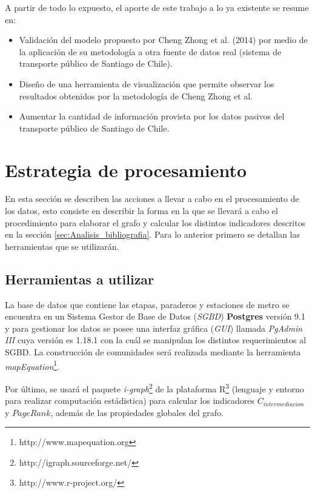 \documentclass[12pt]{article}
\begin{document}
	A partir de todo lo expuesto, el aporte de este trabajo a lo ya existente se resume en:
	
	\begin{itemize}
	\item Validación del modelo propuesto por Cheng Zhong et al. (2014) \cite{Estructura_urbana} por medio de la aplicación de su metodología a otra fuente de datos real (sistema de transporte público de Santiago de Chile).
	\item Diseño de una herramienta de visualización que permite observar los resultados obtenidos por la metodología de Cheng Zhong et al.
	\item Aumentar la cantidad de información provista por los datos pasivos del transporte público de Santiago de Chile.
	
	\end{itemize}
	
    \newpage
    \section{Estrategia de procesamiento}
  
	En esta sección se describen las acciones a llevar a cabo en el procesamiento de los datos, esto consiste en describir la forma en la que se llevará a cabo el procedimiento para elaborar el grafo y calcular los distintos indicadores descritos en la sección \ref{sec:Analisis_bibliografia}. Para lo anterior primero se detallan las herramientas que se utilizarán.

	\subsection{Herramientas a utilizar}
	
	La base de datos que contiene las etapas, paraderos y estaciones de metro se encuentra en un Sistema Gestor de Base de Datos (\textit{SGBD}) \textbf{Postgres} versión 9.1 y para gestionar los datos se posee una interfaz gráfica (\textit{GUI}) llamada \textit{PgAdmin III} cuya versión es 1.18.1 con la cuál se manipulan los distintos requerimientos al SGBD. 
	La construcción de comunidades será realizada mediante la herramienta \textit{mapEquation}\footnote{http://www.mapequation.org}.
	
	Por último, se usará el paquete \textit{i-graph}\footnote{http://igraph.sourceforge.net/} de la plataforma R\footnote{http://www.r-project.org/} (lenguaje y entorno para realizar computación estádistica) para calcular los indicadores $C_{intermediacion}$ y $PageRank$, además de las propiedades globales del grafo.
	 
\end{document}
